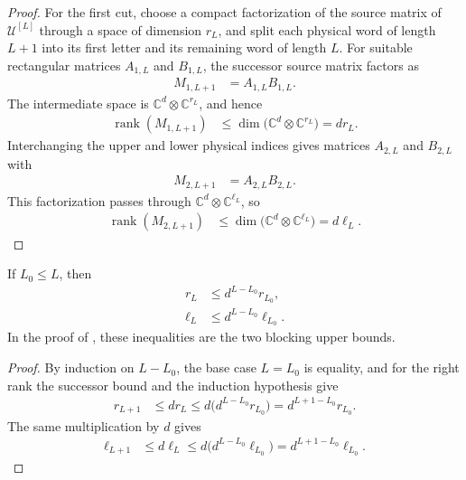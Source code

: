 \begin{proof}\leanok
    For the first cut, choose a compact factorization of the source matrix of
    $\mathcal U^{[L]}$ through a space of dimension $r_L$, and split each physical
    word of length $L+1$ into its first letter and its remaining word of length
    $L$. For suitable rectangular matrices $A_{1,L}$ and $B_{1,L}$, the
    successor source matrix factors as
    \begin{align}
        M_{1,L+1} & =A_{1,L}B_{1,L}.
    \end{align}
    The intermediate space is $\mathbb C^d\otimes\mathbb C^{r_L}$, and hence
    \begin{align}
        \operatorname{rank}(M_{1,L+1})
         & \leq \dim\bigl(\mathbb C^d\otimes\mathbb C^{r_L}\bigr)=d r_L.
    \end{align}
    Interchanging the upper and lower physical indices gives matrices
    $A_{2,L}$ and $B_{2,L}$ with
    \begin{align}
        M_{2,L+1} & =A_{2,L}B_{2,L}.
    \end{align}
    This factorization passes through
    $\mathbb C^d\otimes\mathbb C^{\ell_L}$, so
    \begin{align}
        \operatorname{rank}(M_{2,L+1})
         & \leq \dim\bigl(\mathbb C^d\otimes\mathbb C^{\ell_L}\bigr)=d\ell_L.
    \end{align}
\end{proof}

\begin{lemma}
    \label{thm:mpu_source_cut_rank_blocking}
    \leanok
    If $L_0\leq L$, then
    \begin{align}
        r_L    & \leq d^{L-L_0}r_{L_0},    \\
        \ell_L & \leq d^{L-L_0}\ell_{L_0}.
    \end{align}
    In the proof of \cite[Proposition~IV.2]{Cirac2017MPU}, these inequalities are the two blocking upper
    bounds.
\end{lemma}

\begin{proof}\leanok
    By induction on $L-L_0$, the base case $L=L_0$ is equality, and for the right rank the
    successor bound and the induction hypothesis give
    \begin{align}
        r_{L+1}
         & \leq d r_L
        \leq d\bigl(d^{L-L_0}r_{L_0}\bigr)
        =d^{L+1-L_0}r_{L_0}.
    \end{align}
    The same multiplication by $d$ gives
    \begin{align}
        \ell_{L+1}
         & \leq d\ell_L
        \leq d\bigl(d^{L-L_0}\ell_{L_0}\bigr)
        =d^{L+1-L_0}\ell_{L_0}.
    \end{align}
\end{proof}

